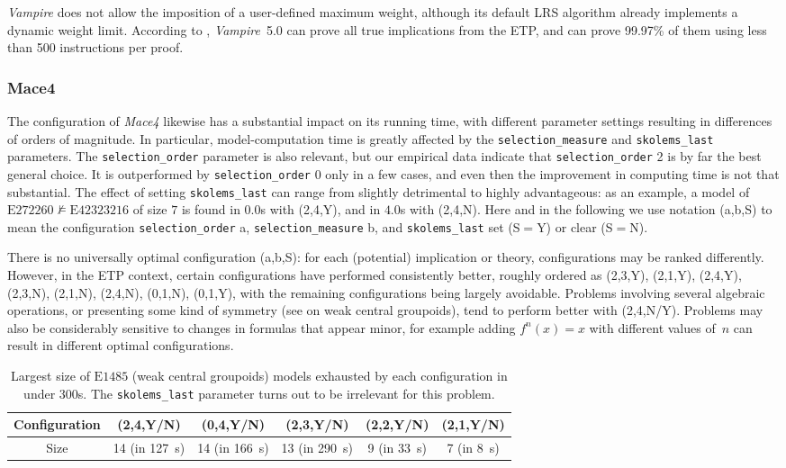 \documentclass[12pt]{amsart}
\theoremstyle{definition}
\newcommand{\nmodels}{\not\models}
\newcommand{\Eq}[1]{\mathrm{E}#1}
\begin{document}
\emph{Vampire} does not allow the imposition of a user-defined maximum weight, although its default LRS algorithm already implements a dynamic weight limit. According to \cite{janota2025experimentalresultsvampireequational}, \emph{Vampire}~5.0 can prove all true implications from the ETP, and can prove 99.97\% of them using less than 500 instructions per proof.

\subsubsection{Mace4}\label{Mace4}

The configuration of \emph{Mace4} likewise has a substantial impact on its running time, with different parameter settings resulting in differences of orders of magnitude. In particular, model-computation time is greatly affected by the \verb|selection_measure| and \verb|skolems_last| parameters. The \verb|selection_order| parameter is also relevant, but our empirical data indicate that \verb|selection_order| 2 is by far the best general choice. It is outperformed by \verb|selection_order| 0 only in a few cases, and even then the improvement in computing time is not that substantial. The effect of setting \verb|skolems_last| can range from slightly detrimental to highly advantageous: as an example, a model of $\Eq{272260}\nmodels\Eq{42323216}$ of size $7$ is found in $0.0$s with (2,4,Y), and in $4.0$s with (2,4,N). Here and in the following we use notation (a,b,S) to mean the configuration \verb|selection_order| a, \verb|selection_measure| b, and \verb|skolems_last| set (S$=$Y) or clear (S$=$N).

There is no universally optimal configuration (a,b,S): for each (potential) implication or theory, configurations may be ranked differently. However, in the ETP context, certain configurations have performed consistently better, roughly ordered as (2,3,Y), (2,1,Y), (2,4,Y), (2,3,N), (2,1,N), (2,4,N), (0,1,N), (0,1,Y), with the remaining configurations being largely avoidable. Problems involving several algebraic operations, or presenting some kind of symmetry (see  on weak central groupoids), tend to perform better with (2,4,N/Y). Problems may also be considerably sensitive to changes in formulas that appear minor, for example adding $f^n(x)=x$ with different values of~$n$ can result in different optimal configurations.

\begin{table}
\centering
\caption{Largest size of $\Eq{1485}$ (weak central groupoids) models exhausted by each configuration in under 300s. The \texttt{skolems\_last} parameter turns out to be irrelevant for this problem.}
\label{table:weakcentralgroupoids}
\begin{tabular}{cccccc}
  \toprule
  Configuration &(2,4,Y/N) & (0,4,Y/N) & (2,3,Y/N) & (2,2,Y/N) & (2,1,Y/N) \\\midrule
  Size &14 (in \SI{127}{s}) & 14 (in \SI{166}{s}) & 13 (in \SI{290}{s}) & 9 (in \SI{33}{s}) & 7 (in \SI{8}{s}) \\
  \bottomrule
\end{tabular}
\end{table}
\end{document}
